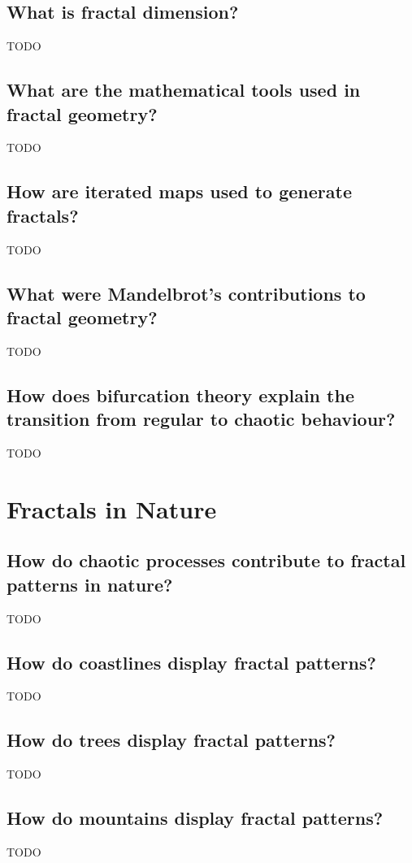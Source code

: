 \documentclass[12pt]{article}
\begin{document}
\subsection{What is fractal dimension?}
TODO

\subsection{What are the mathematical tools used in fractal geometry?}
TODO

\subsection{How are iterated maps used to generate fractals?}
TODO

\subsection{What were Mandelbrot's contributions to fractal geometry?}
TODO

\subsection{How does bifurcation theory explain the transition from regular to chaotic behaviour?}
TODO

\section{Fractals in Nature}
\subsection{How do chaotic processes contribute to fractal patterns in nature?}
TODO

\subsection{How do coastlines display fractal patterns?}
TODO

\subsection{How do trees display fractal patterns?}
TODO

\subsection{How do mountains display fractal patterns?}
TODO
\end{document}
